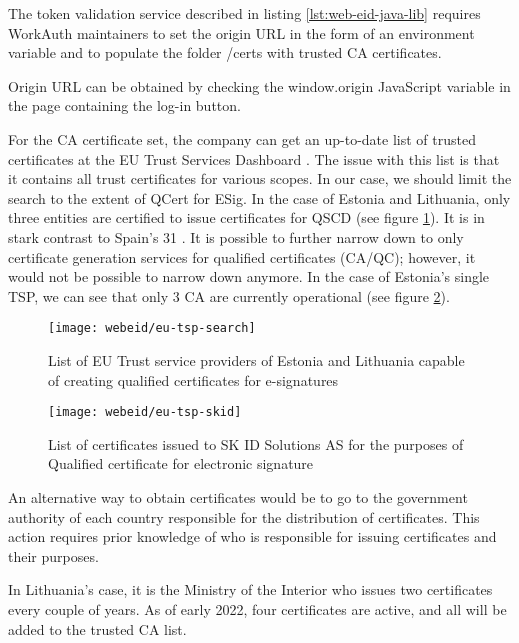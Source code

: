 The token validation service described in listing \ref{lst:web-eid-java-lib} requires WorkAuth maintainers to set the origin URL in the form of an environment variable and to populate the folder {/certs} with trusted CA certificates.

Origin URL can be obtained by checking the {window.origin} JavaScript variable in the page containing the log-in button.

For the CA certificate set, the company can get an up-to-date list of trusted certificates at the EU Trust Services Dashboard \cite{eu-trustservices}. The issue with this list is that it contains all trust certificates for various scopes. In our case, we should limit the search to the extent of QCert for ESig. In the case of Estonia and Lithuania, only three entities are certified to issue certificates for QSCD (see figure \ref{fig:eu-tsp-list}). It is in stark contrast to Spain's 31 \cite{eu-trustservices}. It is possible to further narrow down to only certificate generation services for qualified certificates (CA/QC); however, it would not be possible to narrow down anymore. In the case of Estonia's single TSP, we can see that only 3 CA are currently operational (see figure \ref{fig:eu-tsp-skid}).

\begin{figure}
  \centering
  \texttt{[image: webeid/eu-tsp-search]}
  \caption{List of EU Trust service providers of Estonia and Lithuania capable of creating qualified certificates for e-signatures}
  \label{fig:eu-tsp-list}
\end{figure}

\begin{figure}
  \centering
  \texttt{[image: webeid/eu-tsp-skid]}
  \caption{List of certificates issued to SK ID Solutions AS for the purposes of Qualified certificate for electronic signature}
  \label{fig:eu-tsp-skid}
\end{figure}

An alternative way to obtain certificates would be to go to the government authority of each country responsible for the distribution of certificates. This action requires prior knowledge of who is responsible for issuing certificates and their purposes.

In Lithuania's case, it is the Ministry of the Interior \cite{eid-lt-ministryofinterior-certificates} who issues two certificates every couple of years. As of early 2022, four certificates are active, and all will be added to the trusted CA list.

